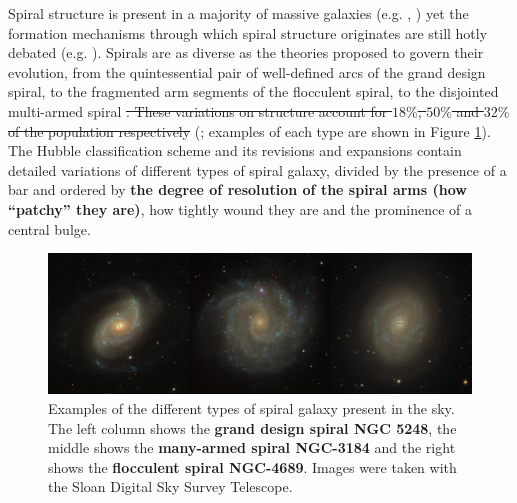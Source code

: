 
Spiral structure is present in a majority of massive galaxies (e.g. \citealt{1989gadv.book..151B}, \citealt{2008MNRAS.389.1179L}) yet the formation mechanisms through which spiral structure originates are still hotly debated (e.g. \citealt{2014PASA...31...35D}). Spirals are as diverse as the theories proposed to govern their evolution, from the quintessential pair of well-defined arcs of the grand design spiral, to the fragmented arm segments of the flocculent spiral, to the disjointed multi-armed spiral
\sout{. These variations on structure account for $18\%$, $50\%$ and $32\%$ of the population respectively}
(\citealt{2011ApJ...737...32E}; examples of each type are shown in Figure \ref{fig:spiral-galaxy-types}). The Hubble classification scheme \citep{1926ApJ....64..321H} and its revisions and expansions \citep{1961hag..book.....S,1991rc3..book.....D} contain detailed variations of different types of spiral galaxy, divided by the presence of a bar and ordered by \textbf{the degree of resolution of the spiral arms (how ``patchy” they are)}, how tightly wound they are and the prominence of a central bulge.

\begin{figure}
  \includegraphics[width=15cm]{plots/galaxy_types.jpg}
  \caption{Examples of the different types of spiral galaxy present in the sky. The left column shows the \textbf{grand design spiral NGC 5248}, the middle shows the \textbf{many-armed spiral NGC-3184} and the right shows the \textbf{flocculent spiral NGC-4689}. Images were taken with the Sloan Digital Sky Survey Telescope.}
  \label{fig:spiral-galaxy-types}
\end{figure}

